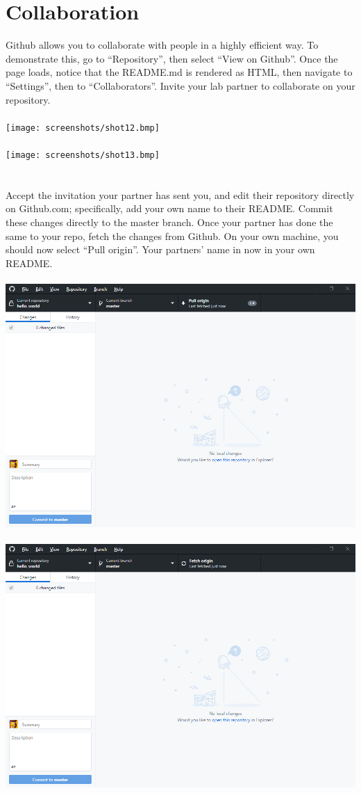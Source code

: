 \documentclass[12pt, letter]{article}
\begin{document}
    \section{Collaboration}
    Github allows you to collaborate with people in a highly efficient way. To demonstrate this, go to ``Repository'', then select ``View on Github''. Once the page loads, notice that the README.md is rendered as HTML, then navigate to ``Settings'', then to ``Collaborators''. Invite your lab partner to collaborate on your repository. \\ \\ %
    \texttt{[image: screenshots/shot12.bmp]} \\ \\
    \texttt{[image: screenshots/shot13.bmp]}
    \\ \\ \\
    Accept the invitation your partner has sent you, and edit their repository directly on Github.com; specifically, add your own name to their README. Commit these changes directly to the master branch. Once your partner has done the same to your repo, fetch the changes from Github. On your own machine, you should now select ``Pull origin''. Your partners' name in now in your own README. \\ \\ %
    \includegraphics{screenshots/shot14.bmp} \\ \\
    \includegraphics{screenshots/shot15.bmp}
\end{document}
